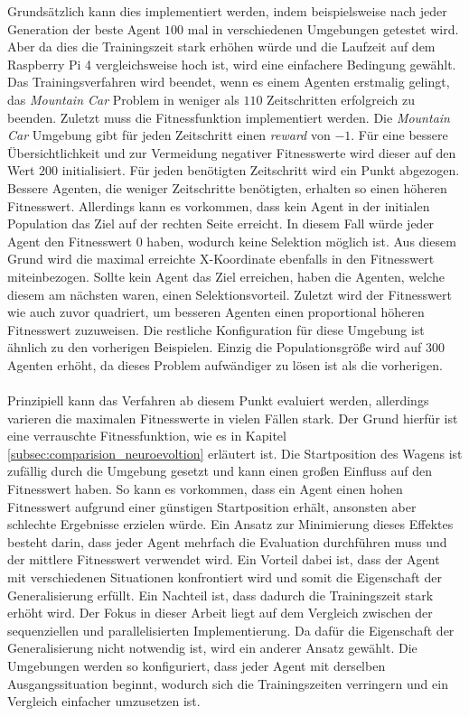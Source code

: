 Grundsätzlich kann dies implementiert werden, indem beispielsweise nach jeder Generation der beste Agent $100$ mal in verschiedenen Umgebungen getestet wird. Aber da dies die Trainingszeit stark erhöhen würde und die Laufzeit auf dem Raspberry Pi 4 vergleichsweise hoch ist, wird eine einfachere Bedingung gewählt. Das Trainingsverfahren wird beendet, wenn es einem Agenten erstmalig gelingt, das \emph{Mountain Car} Problem in weniger als $110$ Zeitschritten erfolgreich zu beenden. Zuletzt muss die Fitnessfunktion implementiert werden. Die \emph{Mountain Car} Umgebung gibt für jeden Zeitschritt einen \emph{reward} von $-1$. Für eine bessere Übersichtlichkeit und zur Vermeidung negativer Fitnesswerte wird dieser auf den Wert $200$ initialisiert. Für jeden benötigten Zeitschritt wird ein Punkt abgezogen. Bessere Agenten, die weniger Zeitschritte benötigten, erhalten so einen höheren Fitnesswert. Allerdings kann es vorkommen, dass kein Agent in der initialen Population das Ziel auf der rechten Seite erreicht. In diesem Fall würde jeder Agent den Fitnesswert $0$ haben, wodurch keine Selektion möglich ist. Aus diesem Grund wird die maximal erreichte X-Koordinate ebenfalls in den Fitnesswert miteinbezogen. Sollte kein Agent das Ziel erreichen, haben die Agenten, welche diesem am nächsten waren, einen Selektionsvorteil. Zuletzt wird der Fitnesswert wie auch zuvor quadriert, um besseren Agenten einen proportional höheren Fitnesswert zuzuweisen. Die restliche Konfiguration für diese Umgebung ist ähnlich zu den vorherigen Beispielen. Einzig die Populationsgröße wird auf $300$ Agenten erhöht, da dieses Problem aufwändiger zu lösen ist als die vorherigen.
\\\\
Prinzipiell kann das Verfahren ab diesem Punkt evaluiert werden, allerdings varieren die maximalen Fitnesswerte in vielen Fällen stark. Der Grund hierfür ist eine verrauschte Fitnessfunktion, wie es in Kapitel \ref{subsec:comparision_neuroevoltion} erläutert ist. Die Startposition des Wagens ist zufällig durch die Umgebung gesetzt und kann einen großen Einfluss auf den Fitnesswert haben. So kann es vorkommen, dass ein Agent einen hohen Fitnesswert aufgrund einer günstigen Startposition erhält, ansonsten aber schlechte Ergebnisse erzielen würde. Ein Ansatz zur Minimierung dieses Effektes besteht darin, dass jeder Agent mehrfach die Evaluation durchführen muss und der mittlere Fitnesswert verwendet wird. Ein Vorteil dabei ist, dass der Agent mit verschiedenen Situationen konfrontiert wird und somit die Eigenschaft der Generalisierung erfüllt. Ein Nachteil ist, dass dadurch die Trainingszeit stark erhöht wird. Der Fokus in dieser Arbeit liegt auf dem Vergleich zwischen der sequenziellen und parallelisierten Implementierung. Da dafür die Eigenschaft der Generalisierung nicht notwendig ist, wird ein anderer Ansatz gewählt. Die Umgebungen werden so konfiguriert, dass jeder Agent mit derselben Ausgangssituation beginnt, wodurch sich die Trainingszeiten verringern und ein Vergleich einfacher umzusetzen ist.
